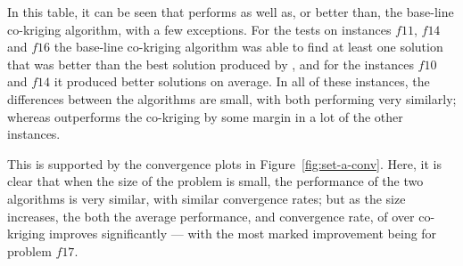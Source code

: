 In this table, it can be seen that \AlgName{} performs as well as, or better than, the base-line co-kriging algorithm, with a few exceptions. For the tests on instances $f11$, $f14$ and $f16$ the base-line co-kriging algorithm was able to find at least one solution that was better than the best solution produced by \AlgName{}, and for the instances $f10$ and $f14$ it produced better solutions on average. In all of these instances, the differences between the algorithms are small, with both performing very similarly; whereas \AlgName{} outperforms the co-kriging by some margin in a lot of the other instances.

This is supported by the convergence plots in Figure~\ref{fig:set-a-conv}. Here, it is clear that when the size of the problem is small, the performance of the two algorithms is very similar, with similar convergence rates; but as the size increases, the both the average performance, and convergence rate, of \AlgName{} over co-kriging improves significantly --- with the most marked improvement being for problem $f17$.

